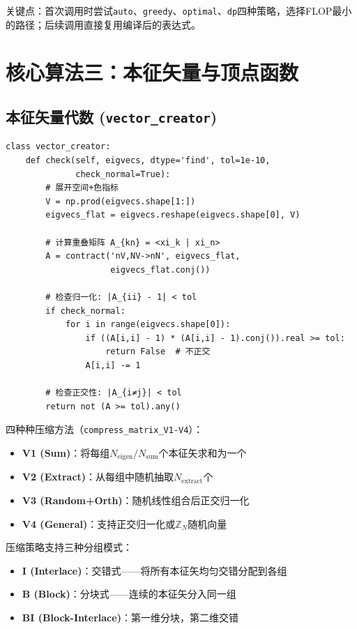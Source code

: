 \documentclass[11pt,a4paper]{ctexart}
\begin{document}
关键点：首次调用时尝试\texttt{auto}、\texttt{greedy}、\texttt{optimal}、\texttt{dp}四种策略，选择FLOP最小的路径；后续调用直接复用编译后的表达式。

\section{核心算法三：本征矢量与顶点函数}

\subsection{本征矢量代数 (\texttt{vector\_creator})}

\begin{codebox}[本征矢量正交归一化检查]
\begin{lstlisting}[style=python]
class vector_creator:
    def check(self, eigvecs, dtype='find', tol=1e-10,
              check_normal=True):
        # 展开空间+色指标
        V = np.prod(eigvecs.shape[1:])
        eigvecs_flat = eigvecs.reshape(eigvecs.shape[0], V)

        # 计算重叠矩阵 A_{kn} = <xi_k | xi_n>
        A = contract('nV,NV->nN', eigvecs_flat,
                     eigvecs_flat.conj())

        # 检查归一化: |A_{ii} - 1| < tol
        if check_normal:
            for i in range(eigvecs.shape[0]):
                if ((A[i,i] - 1) * (A[i,i] - 1).conj()).real >= tol:
                    return False  # 不正交
                A[i,i] -= 1

        # 检查正交性: |A_{i≠j}| < tol
        return not (A >= tol).any()
\end{lstlisting}
\end{codebox}

四种种压缩方法（\texttt{compress\_matrix\_V1-V4}）：
\begin{itemize}
\item \textbf{V1 (Sum)}：将每组$N_{\mathrm{eigen}}/N_{\mathrm{sum}}$个本征矢求和为一个
\item \textbf{V2 (Extract)}：从每组中随机抽取$N_{\mathrm{extract}}$个
\item \textbf{V3 (Random+Orth)}：随机线性组合后正交归一化
\item \textbf{V4 (General)}：支持正交归一化或$\mathbb{Z}_N$随机向量
\end{itemize}

压缩策略支持三种分组模式：
\begin{itemize}
\item \textbf{I (Interlace)}：交错式——将所有本征矢均匀交错分配到各组
\item \textbf{B (Block)}：分块式——连续的本征矢分入同一组
\item \textbf{BI (Block-Interlace)}：第一维分块，第二维交错
\end{itemize}
\end{document}
